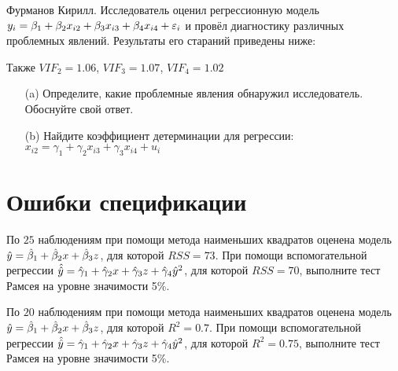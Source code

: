 \documentclass[pdftex,11pt,openany]{book}\usepackage[]{graphicx}\usepackage[]{color}
\begin{document}
\begin{problem}
Фурманов Кирилл. Исследователь оценил регрессионную модель $y_i = \beta_1 + \beta_2 x_{i2} + \beta_3 x_{i3} + \beta_4 x_{i4} + \varepsilon_i$ и провёл диагностику различных проблемных явлений. Результаты его стараний приведены ниже:



Также $VIF_2 = 1.06$, $VIF_3 = 1.07$, $VIF_4 = 1.02$
\begin{enumerate}
\item[(a)] Определите, какие проблемные явления обнаружил исследователь. Обоснуйте свой ответ.
\item[(b)] Найдите коэффициент детерминации для регрессии: $x_{i2} = \gamma_1 + \gamma_2 x_{i3} + \gamma_3 x_{i4} + u_i$
\end{enumerate}
\end{problem}


\begin{solution}
\end{solution}



\chapter{Ошибки спецификации}


\begin{problem}
По $25$ наблюдениям при помощи метода наименьших квадратов оценена
модель $\hat{y}=\hat{\beta}_1+\hat{\beta}_2 x +\hat{\beta}_3 z$, для которой $RSS = 73$. При помощи вспомогательной регрессии $\hat{\hat{y}}=\hat{\gamma}_1+\hat{\gamma}_2 x +\hat{\gamma}_3 z+\hat{\gamma}_4 \hat{y}^2$, для которой $RSS = 70$, выполните тест Рамсея на уровне значимости 5\%. 
\end{problem}

\begin{solution}
\end{solution}


\begin{problem}
По $20$ наблюдениям при помощи метода наименьших квадратов оценена
модель $\hat{y}=\hat{\beta}_1+\hat{\beta}_2 x +\hat{\beta}_3 z$, для которой $R^2 = 0.7$. При помощи вспомогательной регрессии $\hat{\hat{y}}=\hat{\gamma}_1+\hat{\gamma}_2 x +\hat{\gamma}_3 z+\hat{\gamma}_4 \hat{y}^2$, для которой $R^2 = 0.75$, выполните тест Рамсея на уровне значимости 5\%. 
\end{problem}

\begin{solution}
\end{solution}
\end{document}
